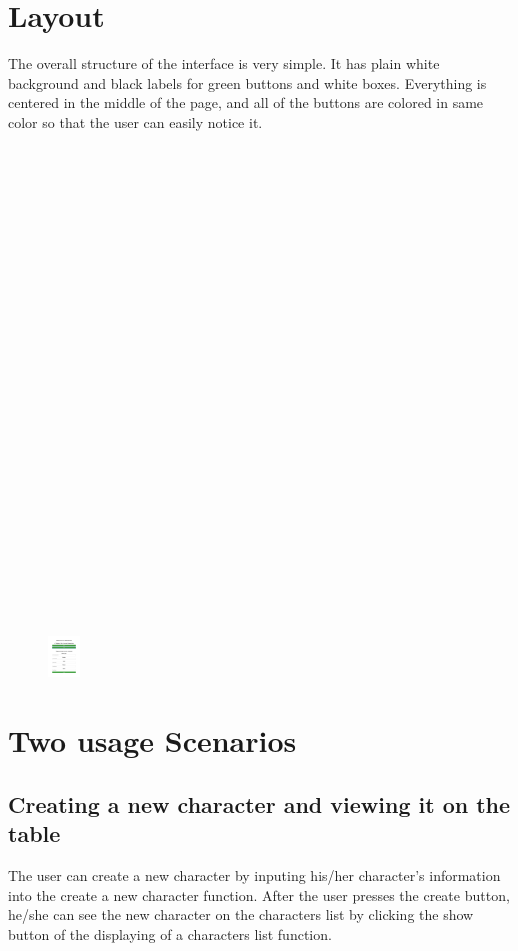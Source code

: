 \documentclass[100pt]{article}
\begin{document}
{\section{\Large{Layout}}
\large{
The overall structure of the interface is very simple. It has plain white background and black labels for green buttons and white boxes. Everything is centered in the middle of the page, and all of the buttons are colored in same color so that the user can easily notice it. 
}\\\\\\\\\\\\\\\\\\\\\\\\\\\\\\\\\\\\\\\\\\\\\\\\\\\

\begin{figure}[h!]
\hspace*{2.2cm} 
\includegraphics[width=0.84cm, natwidth=50,natheight=10]{1.pdf}
\end{figure}

\section{ Two usage Scenarios}
\subsection{Creating a new character and viewing it on the table}
\large{
The user can create a new character by inputing his/her character's information into the create a new character function. After the user presses the create button, he/she can see the new character on the characters list by clicking the show button of the displaying of a characters list function. 
}
}
\end{document}
